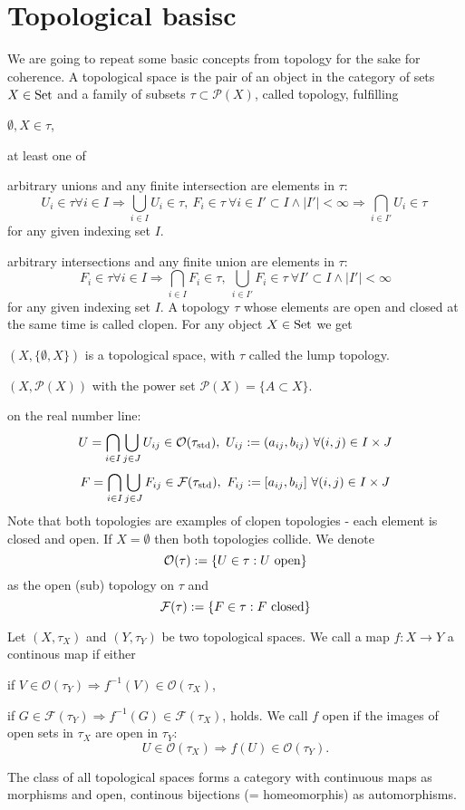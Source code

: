 \section{Topological basisc}
We are going to repeat some basic concepts from topology for the sake for coherence. A topological space is the pair of an object in the category of sets $X \in \mathrm{Set}$ and a family of subsets $\tau \subset \mathcal{P}(X)$, called topology, fulfilling
\bn
\item $\emptyset, X \in \tau$,
\item at least one of
\bd
\item[Open] arbitrary unions and any finite intersection are elements in $\tau$:
$$U_i \in \tau \forall i \in I \Rightarrow \bigcup_{i \in I} U_i \in \tau,\ F_i \in \tau\ \forall i \in I' \subset I \wedge |I'| < \infty \Rightarrow \bigcap_{i \in I'} U_i \in \tau\ $$
for any given indexing set $I$.
\item[Closed] arbitrary intersections and any finite union are elements in $\tau$:
$$F_i \in \tau \forall i \in I \Rightarrow \bigcap_{i \in I} F_i \in \tau,\ \bigcup_{i \in I'} F_i \in \tau\ \forall I' \subset I \wedge |I'| < \infty$$
for any given indexing set $I$.
\ed
\en
A topology $\tau$ whose elements are open and closed at the same time is called clopen.
\exmpl For any object $X \in \mathrm{Set}$ we get
\bd
\item[Lump topology] $(X,\{\emptyset,X\})$ is a topological space, with $\tau$ called the lump topology.
\item[Discrete topology] $(X,\mathcal{P}(X))$ with the power set $\mathcal{P}(X) = \{A \subset X\}$.
\item[Standard topology] on the real number line:
$$U = \bigcap_{i \in I} \bigcup_{j \in J} U_{ij} \in \mathcal{O}(\tau_{\mrm{std}}),\ U_{ij} := (a_{ij},b_{ij})\ \forall (i,j) \in I \times J$$
$$F = \bigcap_{i \in I} \bigcup_{j \in J} F_{ij} \in \mathcal{F}(\tau_{\mathrm{std}}),\ F_{ij} := [a_{ij},b_{ij}]\ \forall (i,j) \in I \times J$$
\ed
Note that both topologies are examples of clopen topologies - each element is closed and open. If $X = \emptyset$ then both topologies collide.
We denote
$$\mathcal{O}(\tau) := \{U \in \tau: U\ \mrm{open}\}$$
as the open (sub) topology on $\tau$ and
$$\mathcal{F}(\tau) := \{F \in \tau: F\ \mrm{closed}\}$$
\begin{defi}
Let $(X, \tau_X)$ and $(Y,\tau_Y)$ be two topological spaces. We call a map $f : X \longrightarrow Y$ a continous map if either
\bn
\item if $V \in \mathcal{O}(\tau_Y) \Rightarrow f^{-1}(V) \in \mathcal{O}(\tau_X)$,
\item if $G \in \mathcal{F}(\tau_Y) \Rightarrow f^{-1}(G) \in \mathcal{F}(\tau_X)$,
\en
holds.
We call $f$ open if the images of open sets in $\tau_X$ are open in $\tau_Y$:
$$U \in \mathcal{O}(\tau_X) \Rightarrow f(U) \in \mathcal{O}(\tau_Y).$$
\end{defi}
\begin{prop}
The class of all topological spaces forms a category with continuous maps as morphisms and open, continous bijections (= homeomorphis) as automorphisms.
\end{prop}
